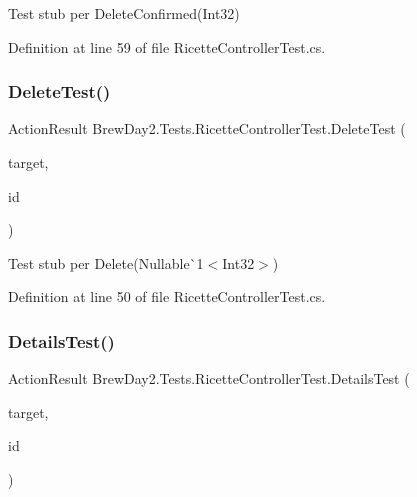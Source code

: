 Test stub per Delete\+Confirmed(\+Int32)



Definition at line 59 of file Ricette\+Controller\+Test.\+cs.

\mbox{\label{class_brew_day2_1_1_tests_1_1_ricette_controller_test_adde8a12157848fdf695ce1ce231a375c}} 
\subsubsection{\texorpdfstring{Delete\+Test()}{DeleteTest()}}
{\footnotesize\ttfamily Action\+Result Brew\+Day2.\+Tests.\+Ricette\+Controller\+Test.\+Delete\+Test (\begin{DoxyParamCaption}\item[{\mbox{[}\+Pex\+Assume\+Under\+Test\mbox{]} \mbox{\hyperlink{class_brew_day2_1_1_controllers_1_1_ricette_controller}{Ricette\+Controller}}}]{target,  }\item[{int?}]{id }\end{DoxyParamCaption})}



Test stub per Delete(Nullable\`{}1$<$Int32$>$)



Definition at line 50 of file Ricette\+Controller\+Test.\+cs.

\mbox{\label{class_brew_day2_1_1_tests_1_1_ricette_controller_test_a0da220a068c8ac875ca8fedd5f1f6a0f}} 
\subsubsection{\texorpdfstring{Details\+Test()}{DetailsTest()}}
{\footnotesize\ttfamily Action\+Result Brew\+Day2.\+Tests.\+Ricette\+Controller\+Test.\+Details\+Test (\begin{DoxyParamCaption}\item[{\mbox{[}\+Pex\+Assume\+Under\+Test\mbox{]} \mbox{\hyperlink{class_brew_day2_1_1_controllers_1_1_ricette_controller}{Ricette\+Controller}}}]{target,  }\item[{int?}]{id }\end{DoxyParamCaption})}




